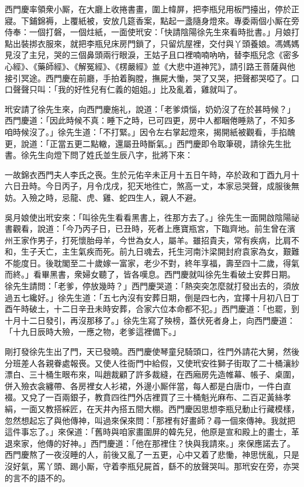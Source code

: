 西門慶率領衆小厮，在大廳上收捲書畫，圍上幃屏，把李瓶兒用板門擡出，停於正寢。下鋪錦褥，上覆紙被，安放几筵香案，點起一盞隨身燈來。專委兩個小厮在旁侍奉：一個打磐，一個炷紙，一面使玳安：「快請陰陽徐先生來看時批書。」月娘打點出裝挷衣服來，就把李瓶兒床房門鎖了，只留炕屋裡，交付與丫頭養娘。馮媽媽見沒了主兒，哭的三個鼻頭兩行眼淚，王姑子且口裡喃喃吶吶，{}替李瓶兒念《密多心經》、《藥師經》、《解冤經》、《楞嚴經》並《大悲中道神咒》，請引路王菩薩與他接引冥途。西門慶在前廳，手拍着胸膛，撫屍大慟，哭了又哭，把聲都哭啞了。口口聲聲只叫：「我的好性兒有仁義的姐姐。」比及亂着，雞就叫了。

玳安請了徐先生來，向西門慶施礼，說道：「老爹煩惱，奶奶沒了在於甚時候？」西門慶道：「因此時候不真：睡下之時，已可四更，房中人都睏倦睡熟了，不知多咱時候沒了。」徐先生道：「不打緊。」因令左右掌起燈來，揭開紙被觀看，手掐醜更，說道：「正當五更二點轍，還屬丑時斷氣。」西門慶即令取筆硯，請徐先生批書。徐先生向燈下問了姓氏並生辰八字，批將下來：

\begin{myquote}[\markfont]
一故錦衣西門夫人李氏之䘮。生於元佑辛未正月十五日午時，卒於政和丁酉九月十六日丑時。今日丙子，月令戊戌，犯天地徃亡，煞高一丈，本家忌哭聲，成服後無妨。入殮之時，忌龍、虎、雞、蛇四生人，親人不避。
\end{myquote}

吳月娘使出玳安來：「叫徐先生看看黑書上，徃那方去了。」徐先生一面開啟陰陽祕書觀看，說道：「今乃丙子日，已丑時，死者上應寶瓶宮，下臨齊地。前生曾在濱州王家作男子，打死懷胎母羊，今世為女人，屬羊。雖招貴夫，常有疾病，比肩不和，生子夭亡，主生氣疾而死。前九日魂去，托生河南汴梁開封府袁家為女，艱難不能度日。後耽閣至二十歲嫁一富家，老少不對，終年享福，壽至四十二歲，得氣而終。」{}看畢黑書，衆婦女聽了，皆各嘆息。西門慶就叫徐先生看破土安葬日期。徐先生請問：「老爹，停放幾時？」西門慶哭道：「熱突突怎麼就打發出去的，須放過五七纔好。」徐先生道：「五七內沒有安葬日期，倒是四七內，宜擇十月初八日丁酉午時破土，十二日辛丑未時安葬，合家六位本命都不犯。」西門慶道：「也罷，到十月十二日發引，再沒那移了。」徐先生寫了殃榜，蓋伏死者身上，向西門慶道：「十九日辰時大殮，一應之物，老爹這裡備下。」

剛打發徐先生出了門，天已發曉。西門慶使琴童兒騎頭口，徃門外請花大舅，然後分班差人各親眷處報䘮。又使人徃衙門中給假，又使玳安徃獅子街取了二十桶瀼紗漂白、三十桶生眼布來，叫趙裁顧了許多裁縫，在西廂房先造帷幕、帳子、桌圍，併入殮衣衾纏帶、各房裡女人衫裙，外邊小厮伴當，每人都是白唐巾，一件白直裰。又兌了一百兩銀子，教賁四徃門外店裡買了三十桶魁光麻布、二百疋黃絲孝絹，一面又教搭綵匠，在天井內搭五間大棚。西門慶因思想李瓶兒動止行藏模樣，忽然想起忘了與他傳神，叫過來保來問：「那裡有好畫師？尋一個來傳神。我就把這件事忘了。」來保道：「舊時與咱家畫圍屏的韓先兒，他原是宣和殿上的畫士，革退來家，他傳的好神。」西門慶道：「他在那裡住？快與我請來。」來保應諾去了。西門慶熬了一夜沒睡的人，前後又亂了一五更，心中又着了悲慟，神思恍亂，只是沒好氣，罵丫頭、踢小厮，守着李瓶兒屍首，繇不的放聲哭叫。那玳安在旁，亦哭的言不的語不的。{}{}

